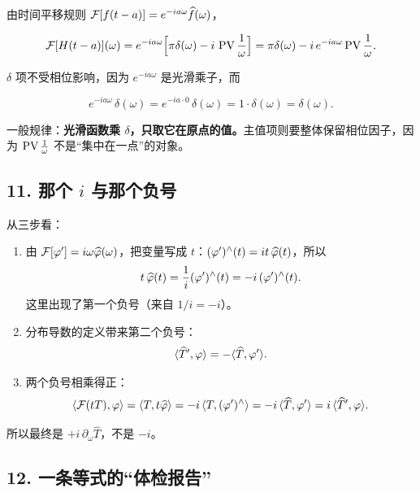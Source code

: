 由时间平移规则 $\mathcal{F}[f(t-a)]=e^{-ia\omega}\widehat{f}(\omega)$，

\begin{equation}
\mathcal{F}[H(t-a)](\omega)=e^{-ia\omega}\Big[\pi\delta(\omega)-i\,\operatorname{PV}\frac{1}{\omega}\Big]
=\pi\delta(\omega)-i\,e^{-ia\omega}\operatorname{PV}\frac{1}{\omega}.
\end{equation}

$\delta$ 项不受相位影响，因为 $e^{-ia\omega}$ 是光滑乘子，而

\begin{equation}
e^{-ia\omega}\,\delta(\omega)=e^{-ia\cdot0}\,\delta(\omega)=1\cdot\delta(\omega)=\delta(\omega).
\end{equation}

一般规律：\textbf{光滑函数乘 $\delta$，只取它在原点的值。}主值项则要整体保留相位因子，因为 $\operatorname{PV}\frac1\omega$ 不是“集中在一点”的对象。

\subsection*{11. 那个 $i$ 与那个负号}

从三步看：

\begin{enumerate}[leftmargin=1.8em,itemsep=0.4em]
\item 由 $\mathcal{F}[\varphi']=i\omega\widehat{\varphi}(\omega)$，把变量写成 $t$：$(\varphi')^{\wedge}(t)=it\,\widehat{\varphi}(t)$，所以
\begin{equation}
t\,\widehat{\varphi}(t)=\frac{1}{i}(\varphi')^{\wedge}(t)=-i\,(\varphi')^{\wedge}(t).
\end{equation}
这里出现了第一个负号（来自 $1/i=-i$）。

\item 分布导数的定义带来第二个负号：
\begin{equation}
\langle \widehat T',\varphi\rangle=-\langle \widehat T,\varphi'\rangle .
\end{equation}

\item 两个负号相乘得正：
\begin{equation}
\langle \mathcal{F}(tT),\varphi\rangle=\langle T,t\widehat{\varphi}\rangle
=-i\,\langle T,(\varphi')^{\wedge}\rangle
=-i\,\langle \widehat T,\varphi'\rangle
=i\,\langle \widehat T',\varphi\rangle.
\end{equation}
\end{enumerate}

所以最终是 $+i\,\partial_\omega\widehat T$，不是 $-i$。

\subsection*{12. 一条等式的“体检报告”}

